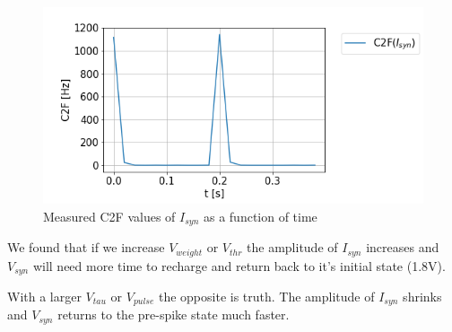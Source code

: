 \begin{figure}[H]
    \centering
    \includegraphics[width=0.95\linewidth]{Figures/synapse_current.png}
    \caption{Measured C2F values of $I_{syn}$ as a function of time}
    \label{fig:basalandcerebellum}
\end{figure}


We found that if we increase $V_{weight}$ or $V_{thr}$ the amplitude of $I_{syn}$ increases and $V_{syn}$ will need more time to recharge and return back to it's initial state (1.8V). 

With a larger $V_{tau}$ or $V_{pulse}$ the opposite is truth. The amplitude of $I_{syn}$ shrinks and $V_{syn}$ returns to the pre-spike state much faster. 




